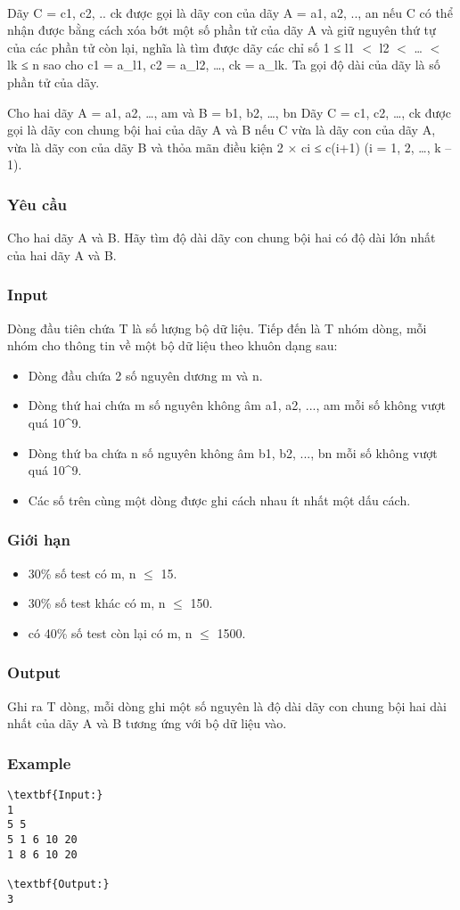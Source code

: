 

 

Dãy C = c1, c2, .. ck được gọi là dãy con của dãy A = a1, a2, .., an nếu C có thể nhận được bằng cách xóa bớt một số phần tử của dãy A và giữ nguyên thứ tự của các phần tử còn lại, nghĩa là tìm được dãy các chỉ số 1 ≤ l1 $<$ l2 $<$ … $<$ lk ≤ n sao cho c1 = a\_l1, c2 = a\_l2, …, ck = a\_lk. Ta gọi độ dài của dãy là số phần tử của dãy.

Cho hai dãy A = a1, a2, …, am và B = b1, b2, …, bn Dãy C = c1, c2, …, ck được gọi là dãy con chung bội hai của dãy A và B nếu C vừa là dãy con của dãy A, vừa là dãy con của dãy B và thỏa mãn điều kiện 2 × ci ≤ c(i+1) (i = 1, 2, …, k – 1).

\subsubsection{Yêu cầu}

Cho hai dãy A và B. Hãy tìm độ dài dãy con chung bội hai có độ dài lớn nhất của hai dãy A và B.

\subsubsection{Input}

Dòng đầu tiên chứa T là số lượng bộ dữ liệu. Tiếp đến là T nhóm dòng, mỗi nhóm cho thông tin về một bộ dữ liệu theo khuôn dạng sau:
\begin{itemize}
	\item Dòng đầu chứa 2 số nguyên dương m và n.
	\item Dòng thứ hai chứa m số nguyên không âm a1, a2, ..., am mỗi số không vượt quá 10\textasciicircum9.
	\item Dòng thứ ba chứa n số nguyên không âm b1, b2, ..., bn mỗi số không vượt quá 10\textasciicircum9.
	\item Các số trên cùng một dòng được ghi cách nhau ít nhất một dấu cách.
\end{itemize}

\subsubsection{Giới hạn}
\begin{itemize}
	\item 30\% số test có m, n  $\le$  15.
	\item 30\% số test khác có m, n  $\le$  150.
	\item có 40\% số test còn lại có m, n  $\le$  1500.
\end{itemize}

\subsubsection{Output}

Ghi ra T dòng, mỗi dòng ghi một số nguyên là độ dài dãy con chung bội hai dài nhất của dãy A và B tương ứng với bộ dữ liệu vào.

\subsubsection{Example}
\begin{verbatim}
\textbf{Input:}
1
5 5
5 1 6 10 20
1 8 6 10 20

\textbf{Output:}
3
\end{verbatim}

